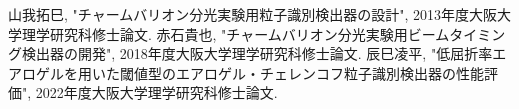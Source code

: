 \begin{thebibliography}{99}
  
   山我拓巳, "チャームバリオン分光実験用粒子識別検出器の設計", 2013年度大阪大学理学研究科修士論文.
   赤石貴也, "チャームバリオン分光実験用ビームタイミング検出器の開発", 2018年度大阪大学理学研究科修士論文.
   辰巳凌平, "低屈折率エアロゲルを用いた閾値型のエアロゲル・チェレンコフ粒子識別検出器の性能評価", 2022年度大阪大学理学研究科修士論文. 
  
  \end{thebibliography}
  
  
  